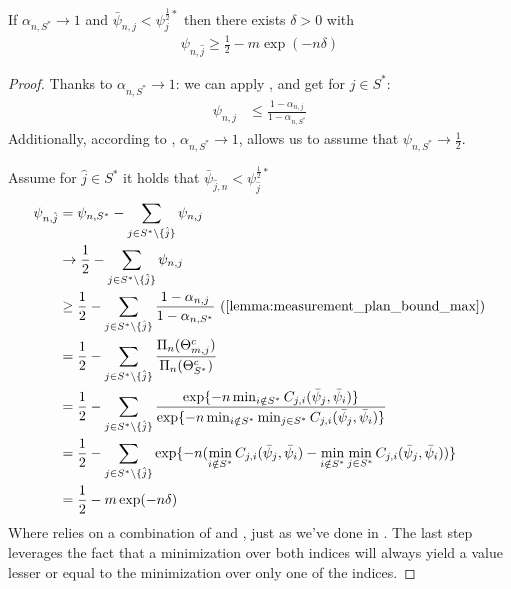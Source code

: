 \textbf{}
If $\alpha_{n, S^*} \rightarrow 1$ and $\bar{\psi}_{n, j} <
\psi^{\frac{1}{2}*}_j$ then there exists $\delta > 0$ with
\begin{align}
  \psi_{n, \hat{j}} \geq \frac{1}{2} - m\exp(-n \delta)
\end{align}
\begin{proof}
  Thanks to $\alpha_{n, S^*} \rightarrow 1$: we can apply
  , and get for $j \in S^*$:
  \begin{align}
    \psi_{n, j} &\leq \frac{1 - \alpha_{n, j}}{1 - \alpha_{n, S^*}}
  \end{align}
  Additionally, according to , $\alpha_{n, S^*}
  \rightarrow 1$, allows us to assume that $\psi_{n, S^*} \rightarrow
  \frac{1}{2}$.

  Assume for $\hat{j} \in S^*$ it holds that $\bar{\psi}_{\hat{j}, n} <
  \psi^{\frac{1}{2}*}_{\hat{j}}$
  \begin{align}
    \psi_{n, \hat{j}} &= \psi_{n, S^*} - \sum_{j \in S^* \setminus
        \{\hat{j}\}} \psi_{n, j}\\
      &\rightarrow \frac{1}{2} - \sum_{j \in S^* \setminus \{\hat{j}\}}
          \psi_{n, j}\\
      &\geq \frac{1}{2} - \sum_{j \in S^* \setminus \{\hat{j}\}} \frac{1 -
          \alpha_{n, j}}{1 - \alpha_{n, S^*}} \text{
          (\Cref{lemma:measurement_plan_bound_max})} \\
      &= \frac{1}{2} - \sum_{j \in S^* \setminus \{\hat{j}\}}
          \frac{\Pi_n(\Theta_{m, j}^c)}{\Pi_n(\Theta_{S^*}^c)} \\
      &= \frac{1}{2} - \sum_{j \in S^* \setminus \{\hat{j}\}} \frac{\exp\{-n
          \min_{i \notin S^*} C_{j, i}(\bar{\psi}_j, \bar{\psi}_i) \}}{\exp\{-
          n \min_{i \notin S^*} \min_{j \in S^*} C_{j, i}(\bar{\psi}_j,
          \bar{\psi}_i) \}} \label{eq:like_lemma10}\\
      &= \frac{1}{2} - \sum_{j \in S^* \setminus \{\hat{j}\}} \exp\{-
          n(\min_{i \notin S^*} C_{j, i}(\bar{\psi}_j, \bar{\psi}_i) -
          \min_{i \notin S^*} \min_{j \in S^*} C_{j, i}(\bar{\psi}_j,
          \bar{\psi}_i))\} \\
      &= \frac{1}{2} - m \exp(-n\delta)
  \end{align}
  Where  relies on a combination of
   and , just as we've done in
  . The last step leverages the fact that a
  minimization over both indices will always yield a value lesser or equal to
  the minimization over only one of the indices.
\end{proof}
